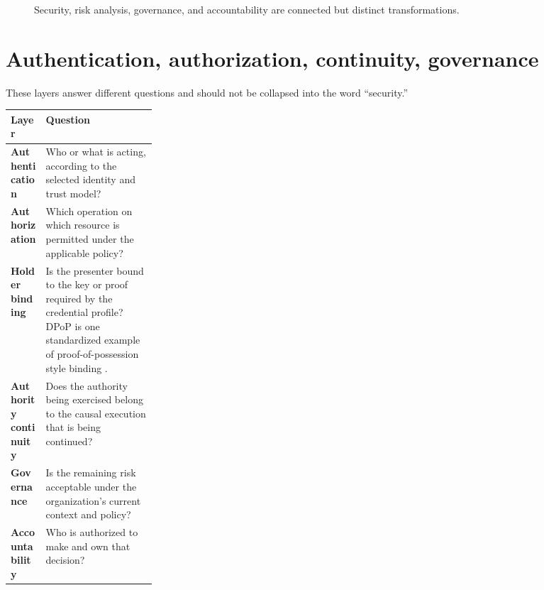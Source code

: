 \documentclass[10pt,oneside,openany]{book}
\begin{document}
\begin{figure}[ht]
\centering
{}
\caption{Security, risk analysis, governance, and accountability are connected but distinct transformations.}
\end{figure}

\section{Authentication, authorization, continuity, governance}

These layers answer different questions and should not be collapsed into the word ``security.''

\begin{center}
\small
\begin{tabularx}{0.96\linewidth}{>{\bfseries}p{0.24\linewidth} Y}
\toprule
Layer & Question \\
\midrule
Authentication & Who or what is acting, according to the selected identity and trust model? \\
Authorization & Which operation on which resource is permitted under the applicable policy? \\
Holder binding & Is the presenter bound to the key or proof required by the credential profile? DPoP is one standardized example of proof-of-possession style binding \cite{rfc9449}. \\
Authority continuity & Does the authority being exercised belong to the causal execution that is being continued? \\
Governance & Is the remaining risk acceptable under the organization's current context and policy? \\
Accountability & Who is authorized to make and own that decision? \\
\bottomrule
\end{tabularx}
\end{center}
\end{document}
